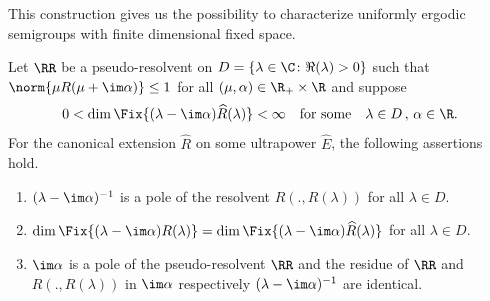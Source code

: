 This construction gives us the possibility to characterize uniformly ergodic semigroups with finite dimensional fixed space.
\begin{lemma}\label{lem:d3-2.2}
Let $\RR$ be a pseudo-resolvent on $D = \{\lambda \in \C \colon \Re(\lambda) > 0\}$ such that $\norm{\mu R(\mu+\im\alpha)} \leq 1$ for all $(\mu,\alpha) \in \R_{+} \times \R$ and suppose
\[
0 < \dim \Fix  {(\lambda-\im\alpha)\widehat{R}(\lambda)} < \infty \quad \text{for some} \quad \lambda \in D \, , \, \alpha \in \R .
\]
For the canonical extension $\widehat{R}$ on some ultrapower $\widehat{E}$, the following assertions hold.
\begin{enumerate}[\upshape (i)]
\item\label{d3-2.2-i}
$(\lambda - \im\alpha)^{-1}$ is a pole of the resolvent $R(.,R(\lambda))$ for all $\lambda \in D$.

\item\label{d3-2.2-ii}
$\dim \Fix  {(\lambda-\im\alpha)R(\lambda)} 
	= \dim \Fix{(\lambda-\im\alpha)\widehat{R}(\lambda)}$ for all $\lambda \in D$.

\item\label{d3-2.2-iii}
$\im\alpha$ is a pole of the pseudo-resolvent $\RR$ and the residue of\/ $\RR$ and $R(.,R(\lambda))$ in $\im\alpha$ respectively $(\lambda - \im\alpha)^{-1}$ are identical.

\end{enumerate}
\end{lemma}
